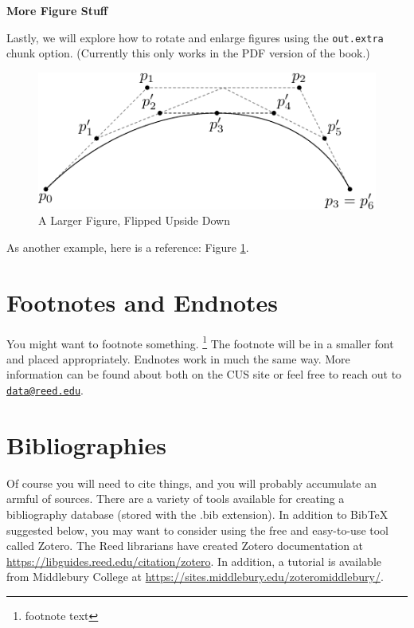 \documentclass[12pt,twoside]{reedthesis}
\begin{document}
\textbf{More Figure Stuff}

Lastly, we will explore how to rotate and enlarge figures using the \texttt{out.extra} chunk option. (Currently this only works in the PDF version of the book.)
\begin{figure}
\includegraphics[angle=180, scale=1.1]{figure/subdivision} \caption{A Larger Figure, Flipped Upside Down}\label{fig:subd2}
\end{figure}
As another example, here is a reference: Figure \ref{fig:subd2}.

\hypertarget{footnotes-and-endnotes}{%
\section{Footnotes and Endnotes}\label{footnotes-and-endnotes}}

You might want to footnote something. \footnote{footnote text} The footnote will be in a smaller font and placed appropriately. Endnotes work in much the same way. More information can be found about both on the CUS site or feel free to reach out to \href{mailto:data@reed.edu}{\nolinkurl{data@reed.edu}}.

\hypertarget{bibliographies}{%
\section{Bibliographies}\label{bibliographies}}

Of course you will need to cite things, and you will probably accumulate an armful of sources. There are a variety of tools available for creating a bibliography database (stored with the .bib extension). In addition to BibTeX suggested below, you may want to consider using the free and easy-to-use tool called Zotero. The Reed librarians have created Zotero documentation at \url{https://libguides.reed.edu/citation/zotero}. In addition, a tutorial is available from Middlebury College at \url{https://sites.middlebury.edu/zoteromiddlebury/}.
\end{document}
